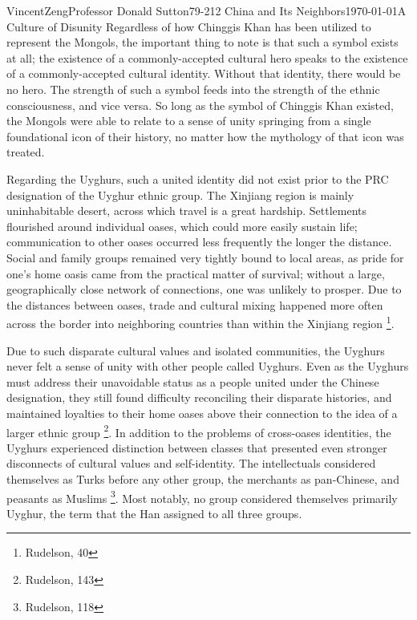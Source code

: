 \documentclass{article}[12pt]
\begin{document}
\begin{mla}{Vincent}{Zeng}{Professor Donald Sutton}{79-212 China and Its Neighbors}{\today}{A Culture of Disunity}
Regardless of how Chinggis Khan has been utilized to represent the Mongols,
the important thing to note is that such a symbol exists at all; the
existence of a commonly-accepted cultural hero speaks to the existence of a
commonly-accepted cultural identity. Without that identity, there would be no
hero. The strength of such a symbol feeds into the strength of the ethnic
consciousness, and vice versa. So long as the symbol of Chinggis Khan existed,
the Mongols were able to relate to a sense of unity springing from a single
foundational icon of their history, no matter how the mythology of that icon was
treated.

Regarding the Uyghurs, such a united identity did not
exist prior to the PRC designation of the Uyghur ethnic group. The Xinjiang
region is mainly uninhabitable desert, across which travel is a great hardship.
Settlements flourished around individual oases, which could more easily sustain
life; communication to other oases occurred less frequently the longer
the distance. Social and family groups remained very tightly bound to local
areas, as pride for one's home oasis came from the practical matter of
survival; without a large, geographically close network of connections, one was
unlikely to prosper. Due to the distances between oases, trade and cultural
mixing happened more often across the border into neighboring countries than
within the Xinjiang region \footnote{Rudelson, 40}.

Due to such disparate cultural values and isolated communities, the Uyghurs never
felt a sense of unity with other people called Uyghurs. Even as the
Uyghurs must address their unavoidable status as a people united under the
Chinese designation, they still found difficulty reconciling their disparate
histories, and maintained loyalties to their home oases above their connection to
the idea of a larger ethnic group \footnote{Rudelson, 143}. In addition to the
problems of cross-oases identities, the Uyghurs experienced distinction between
classes that presented even stronger disconnects of cultural values and
self-identity. The intellectuals considered themselves as Turks before
any other group, the merchants as pan-Chinese, and peasants as Muslims
\footnote{Rudelson, 118}. Most notably, no group considered themselves
primarily Uyghur, the term that the Han assigned to all three groups.


\end{mla}
\end{document}
